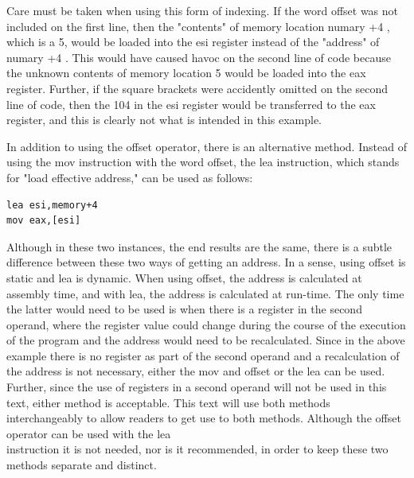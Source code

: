 \documentclass[10pt]{book}
\begin{document}
\begin{center}
\begin{center}
\begin{center}
Care must be taken when using this form of indexing. If the word offset was not included on the first line, then the "contents" of memory location numary +4 , which is a 5, would be loaded into the esi register instead of the "address" of numary +4 . This would have caused havoc on the second line of code because the unknown contents of memory location 5 would be loaded into the eax register. Further, if the square brackets were accidently omitted on the second line of code, then the 104 in the esi register would be transferred to the eax register, and this is clearly not what is intended in this example.

In addition to using the offset operator, there is an alternative method. Instead of using the mov instruction with the word offset, the lea instruction, which stands for "load effective address," can be used as follows:

\begin{verbatim}
lea esi,memory+4
mov eax,[esi]
\end{verbatim}

Although in these two instances, the end results are the same, there is a subtle difference between these two ways of getting an address. In a sense, using offset is static and lea is dynamic. When using offset, the address is calculated at assembly time, and with lea, the address is calculated at run-time. The only time the latter would need to be used is when there is a register in the second operand, where the register value could change during the course of the execution of the program and the address would need to be recalculated. Since in the above example there is no register as part of the second operand and a recalculation of the address is not necessary, either the mov and offset or the lea can be used. Further, since the use of registers in a second operand will not be used in this text, either method is acceptable. This text will use both methods interchangeably to allow readers to get use to both methods. Although the offset operator can be used with the lea\\
instruction it is not needed, nor is it recommended, in order to keep these two methods separate and distinct.


\end{center}
\end{center}
\end{center}
\end{document}
